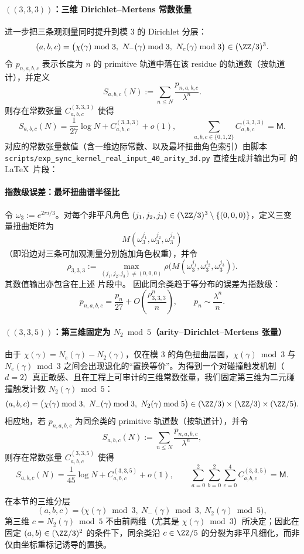 \paragraph{\texorpdfstring{$((3,3,3))$}{(3,3,3)}：三维 Dirichlet--Mertens 常数张量}
进一步把三条观测量同时提升到模 $3$ 的 Dirichlet 分层：
$$
(a,b,c)=\bigl(\chi(\gamma)\bmod 3,\ N_-(\gamma)\bmod 3,\ N_e(\gamma)\bmod 3\bigr)\in(\ZZ/3)^3.
$$
令 $p_{n,a,b,c}$ 表示长度为 $n$ 的 primitive 轨道中落在该 residue 的轨道数（按轨道计），并定义
$$
S_{a,b,c}(N):=\sum_{n\le N}\frac{p_{n,a,b,c}}{\lambda^n}.
$$
则存在常数张量 $C^{(3,3,3)}_{a,b,c}$ 使得
$$
S_{a,b,c}(N)=\frac{1}{27}\log N + C^{(3,3,3)}_{a,b,c}+o(1),
\qquad
\sum_{a,b,c\in\{0,1,2\}} C^{(3,3,3)}_{a,b,c}=\mathsf{M}.
$$
对应的常数张量数值（含一维边际常数、以及最坏扭曲角色索引）由脚本
\texttt{scripts/exp\_sync\_kernel\_real\_input\_40\_arity\_3d.py}
直接生成并输出为可 \verb|| 的 \LaTeX\ 片段：


\paragraph{指数级误差：最坏扭曲谱半径比}
令 $\omega_3:=e^{2\pi i/3}$。对每个非平凡角色 $(j_1,j_2,j_3)\in(\ZZ/3)^3\setminus\{(0,0,0)\}$，定义三变量扭曲矩阵为
$$
M(\omega_3^{j_1},\omega_3^{j_2},\omega_3^{j_3})
$$
（即沿边对三条可加观测量分别施加角色权重），并令
$$
\rho_{3,3,3}
:=
\max_{(j_1,j_2,j_3)\neq(0,0,0)}
\rho\bigl(M(\omega_3^{j_1},\omega_3^{j_2},\omega_3^{j_3})\bigr).
$$
其数值输出亦包含在上述 \verb|| 片段中。
因此同余类趋于等分布的误差为指数级：
$$
p_{n,a,b,c}=\frac{p_n}{27}+O\!\left(\frac{\rho_{3,3,3}^n}{n}\right),
\qquad
p_n\sim\frac{\lambda^n}{n}.
$$

\paragraph{\texorpdfstring{$((3,3,5))$}{(3,3,5)}：第三维固定为 \texorpdfstring{$N_2\bmod 5$}{N2 mod 5}（arity--Dirichlet--Mertens 张量）}
由于 $\chi(\gamma)=N_e(\gamma)-N_2(\gamma)$，仅在模 $3$ 的角色扭曲层面，$\chi(\gamma)\bmod 3$ 与 $N_e(\gamma)\bmod 3$ 之间会出现退化的“置换等价”。为得到一个对碰撞触发机制（$d=2$）真正敏感、且在工程上可审计的三维常数张量，我们固定第三维为二元碰撞触发计数
\(
N_2(\gamma)\bmod 5
\)：
$$
(a,b,c)=\bigl(\chi(\gamma)\bmod 3,\ N_-(\gamma)\bmod 3,\ N_2(\gamma)\bmod 5\bigr)\in(\ZZ/3)\times(\ZZ/3)\times(\ZZ/5).
$$
相应地，若 $p_{n,a,b,c}$ 为同余类的 primitive 轨道数（按轨道计），并令
$$
S_{a,b,c}(N):=\sum_{n\le N}\frac{p_{n,a,b,c}}{\lambda^n},
$$
则存在常数张量 $C^{(3,3,5)}_{a,b,c}$ 使得
$$
S_{a,b,c}(N)=\frac{1}{45}\log N + C^{(3,3,5)}_{a,b,c}+o(1),
\qquad
\sum_{a=0}^2\sum_{b=0}^2\sum_{c=0}^4 C^{(3,3,5)}_{a,b,c}=\mathsf{M}.
$$
\begin{remark}\label{prop:arity-335-n2-nondegenerate}
在本节的三维分层
$$
(a,b,c)=\bigl(\chi(\gamma)\bmod 3,\ N_-(\gamma)\bmod 3,\ N_2(\gamma)\bmod 5\bigr),
$$
第三维 $c=N_2(\gamma)\bmod 5$ 不由前两维（尤其是 $\chi(\gamma)\bmod 3$）所决定；因此在固定 $(a,b)\in(\ZZ/3)^2$ 的条件下，同余类沿 $c\in\ZZ/5$ 的分裂为非平凡细化，而非仅由坐标重标记诱导的置换。
\end{remark}

